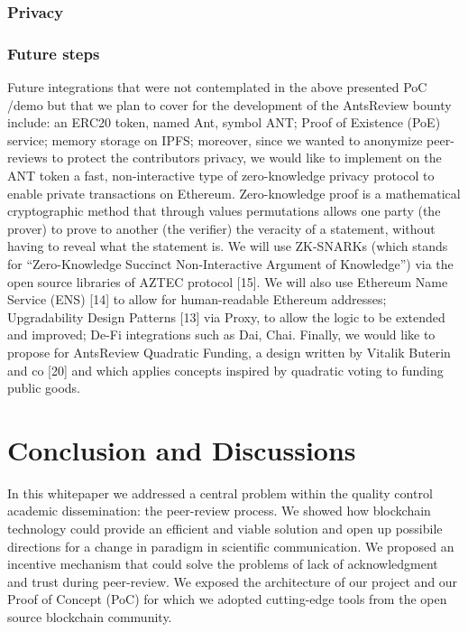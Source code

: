 \documentclass[runningheads]{llncs}
\begin{document}
\newline


\subsubsection{Privacy}



\subsubsection{Future steps}
Future integrations that were not contemplated in the above presented PoC /demo but that we plan to cover for the development of the AntsReview bounty include: an ERC20 token, named Ant,  symbol ANT; Proof of Existence (PoE) service; memory storage on IPFS; moreover, since we wanted to anonymize peer-reviews to protect the contributors privacy, we would like to implement on the ANT token a fast, non-interactive type of zero-knowledge privacy protocol to enable private transactions on Ethereum. Zero-knowledge proof is a mathematical cryptographic method that through values permutations allows one party (the prover) to prove to another (the verifier) the veracity of a statement, without having to reveal what the statement is. We will use ZK-SNARKs (which stands for “Zero-Knowledge Succinct Non-Interactive Argument of Knowledge”) via the open source libraries of AZTEC protocol [15]. We will also use Ethereum Name Service (ENS) [14] to allow for human-readable Ethereum addresses; Upgradability Design Patterns [13] via Proxy, to allow the logic to be extended and improved; De-Fi integrations such as Dai, Chai. Finally, we would like to propose for AntsReview Quadratic Funding, a design written by Vitalik Buterin and co [20] and which applies concepts inspired by quadratic voting to funding public goods.

\section{Conclusion and Discussions}
In this whitepaper we addressed a central problem within the quality control academic dissemination: the peer-review process. We showed how blockchain technology could provide an efficient and viable solution and open up possibile directions for a change in paradigm in scientific communication. We proposed an incentive mechanism that could solve the problems of lack of acknowledgment and trust during peer-review. We exposed the architecture of our project and our Proof of Concept (PoC) for which we adopted cutting-edge tools from the open source blockchain community.
\end{document}

